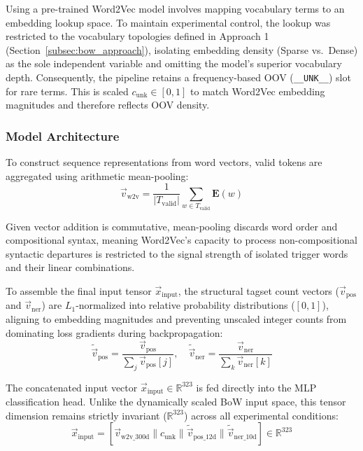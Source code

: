 \documentclass[12pt, a4paper]{article}
\begin{document}
Using a pre-trained Word2Vec model involves mapping vocabulary terms to an embedding lookup space. To maintain experimental control, the lookup was restricted to the vocabulary topologies defined in Approach 1 (Section~\ref{subsec:bow_approach}), isolating embedding density (Sparse vs.\ Dense) as the sole independent variable and omitting the model's superior vocabulary depth. Consequently, the pipeline retains a frequency-based OOV (\texttt{\_\_UNK\_\_}) slot for rare terms. This is scaled $c_{\text{unk}} \in [0, 1]$ to match Word2Vec embedding magnitudes and therefore reflects OOV density.

\subsubsection{Model Architecture}
\label{subsubsec:model_architecture_w2v}

To construct sequence representations from word vectors, valid tokens are aggregated using arithmetic mean-pooling:
\[
\vec{v}_{\text{w2v}} = \frac{1}{\vert T_{\text{valid}} \vert} \sum_{w \in T_{\text{valid}}} \mathbf{E}(w)
\]

Given vector addition is commutative, mean-pooling discards word order and compositional syntax, meaning Word2Vec's capacity to process non-compositional syntactic departures is restricted to the signal strength of isolated trigger words and their linear combinations. 

To assemble the final input tensor $\vec{x}_{\text{input}}$, the structural tagset count vectors ($\vec{v}_{\text{pos}}$ and $\vec{v}_{\text{ner}}$) are $L_1$-normalized into relative probability distributions ($[0, 1]$), aligning to embedding magnitudes and preventing unscaled integer counts from dominating loss gradients during backpropagation:
\[
\tilde{\vec{v}}_{\text{pos}} = \frac{\vec{v}_{\text{pos}}}{\sum_j \vec{v}_{\text{pos}}[j]}, \quad \tilde{\vec{v}}_{\text{ner}} = \frac{\vec{v}_{\text{ner}}}{\sum_k \vec{v}_{\text{ner}}[k]}
\]

The concatenated input vector $\vec{x}_{\text{input}} \in \mathbb{R}^{323}$ is fed directly into the MLP classification head. Unlike the dynamically scaled BoW input space, this tensor dimension remains strictly invariant ($\mathbb{R}^{323}$) across all experimental conditions:
\[
\vec{x}_{\text{input}} = \left[ \vec{v}_{\text{w2v\_300d}} \parallel c_{\text{unk}} \parallel \tilde{\vec{v}}_{\text{pos\_12d}} \parallel \tilde{\vec{v}}_{\text{ner\_10d}} \right] \in \mathbb{R}^{323}
\]
\end{document}
